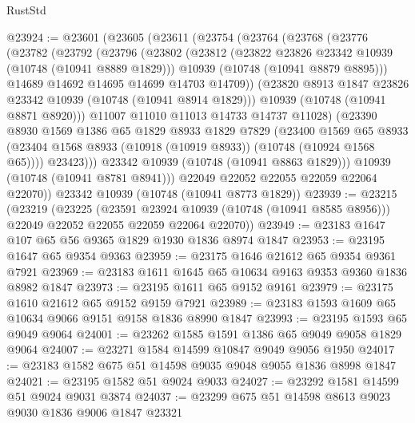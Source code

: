 \begin{lexlean}{RustStd}
\begin{coremodule}
@23924 := @23601
    (@23605
      (@23611
        (@23754
          (@23764
            (@23768
              (@23776
                (@23782
                  (@23792
                    (@23796
                      (@23802
                        (@23812
                          (@23822 @23826 @23342 @10939 (@10748 (@10941 @8889 @1829)))
                          @10939
                          (@10748 (@10941 @8879 @8895)))
                        @14689
                        @14692
                        @14695
                        @14699
                        @14703
                        @14709))
                    (@23820 @8913 @1847 @23826 @23342 @10939 (@10748 (@10941 @8914 @1829)))
                    @10939
                    (@10748 (@10941 @8871 @8920)))
                  @11007
                  @11010
                  @11013
                  @14733
                  @14737
                  @11028)
                (@23390
                  @8930
                  @1569
                  @1386
                  @65
                  @1829
                  @8933
                  @1829
                  @7829
                  (@23400
                    @1569
                    @65
                    @8933
                    (@23404 @1568 @8933 (@10918 (@10919 @8933)) (@10748 (@10924 @1568 @65))))
                  @23423)))
            @23342
            @10939
            (@10748 (@10941 @8863 @1829)))
          @10939
          (@10748 (@10941 @8781 @8941)))
        @22049
        @22052
        @22055
        @22059
        @22064
        @22070))
    @23342
    @10939
    (@10748 (@10941 @8773 @1829))
@23939 := @23215
    (@23219
      (@23225
        (@23591 @23924 @10939 (@10748 (@10941 @8585 @8956)))
        @22049
        @22052
        @22055
        @22059
        @22064
        @22070))
@23949 := @23183 @1647 @107 @65 @56 @9365 @1829 @1930 @1836 @8974 @1847
@23953 := @23195 @1647 @65 @9354 @9363
@23959 := @23175 @1646 @21612 @65 @9354 @9361 @7921
@23969 := @23183 @1611 @1645 @65 @10634 @9163 @9353 @9360 @1836 @8982 @1847
@23973 := @23195 @1611 @65 @9152 @9161
@23979 := @23175 @1610 @21612 @65 @9152 @9159 @7921
@23989 := @23183 @1593 @1609 @65 @10634 @9066 @9151 @9158 @1836 @8990 @1847
@23993 := @23195 @1593 @65 @9049 @9064
@24001 := @23262 @1585 @1591 @1386 @65 @9049 @9058 @1829 @9064
@24007 := @23271 @1584 @14599 @10847 @9049 @9056 @1950
@24017 := @23183 @1582 @675 @51 @14598 @9035 @9048 @9055 @1836 @8998 @1847
@24021 := @23195 @1582 @51 @9024 @9033
@24027 := @23292 @1581 @14599 @51 @9024 @9031 @3874
@24037 := @23299 @675 @51 @14598 @8613 @9023 @9030 @1836 @9006 @1847 @23321

\end{coremodule}
\end{lexlean}

